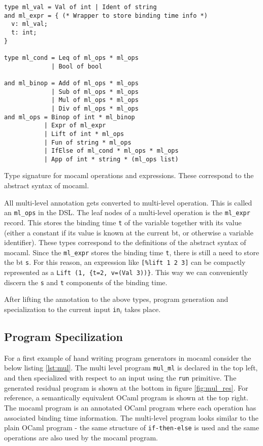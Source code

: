 \begin{listing}[H]
\begin{verbatim}
type ml_val = Val of int | Ident of string
and ml_expr = { (* Wrapper to store binding time info *)
  v: ml_val;
  t: int;
}

type ml_cond = Leq of ml_ops * ml_ops
             | Bool of bool

and ml_binop = Add of ml_ops * ml_ops
             | Sub of ml_ops * ml_ops
             | Mul of ml_ops * ml_ops
             | Div of ml_ops * ml_ops
and ml_ops = Binop of int * ml_binop
           | Expr of ml_expr
           | Lift of int * ml_ops
           | Fun of string * ml_ops
           | IfElse of ml_cond * ml_ops * ml_ops
           | App of int * string * (ml_ops list)
\end{verbatim}  
\caption{Type signature for mocaml operations and expressions. These correspond to the abstract syntax of mocaml.}
\label{lst:dsl}
\end{listing}

All multi-level annotation gets converted to multi-level operation. This is called an \texttt{ml\_ops} in the DSL. The leaf nodes of a multi-level operation is the \texttt{ml\_expr} record. This stores the binding time \texttt{t} of the variable together with its value (either a constant if its value is known at the current bt, or otherwise a variable identifier).
These types correspond to the definitions of the abstract syntax of mocaml.
Since the \texttt{ml\_expr} stores the binding time \texttt{t}, there is still a need to store the bt \texttt{s}. For this reason, an expression like \texttt{[\%lift 1 2 3]} can be compactly represented as a \texttt{Lift (1, \{t=2, v=(Val 3))\}}. This way we can conveniently discern the \texttt{s} and \texttt{t} components of the binding time.

After lifting the annotation to the above types, program generation and specialization to the current input \texttt{in}$_i$ takes place.

\subsection{Program Specilization}

For a first example of hand writing program generators in mocaml consider the below listing \ref{lst:mul}. The multi level program \texttt{mul\_ml} is declared in the top left, and then specialized with respect to an input using the \texttt{run} primitive. The generated residual program is shown at the bottom in figure \ref{fig:mul_res}. For reference, a semantically equivalent OCaml program is shown at the top right. The mocaml program is an annotated OCaml program where each operation has associated binding time information. The multi-level program looks similar to the plain OCaml program - the same structure of \texttt{if-then-else} is used and the same operations are also used by the mocaml program.

